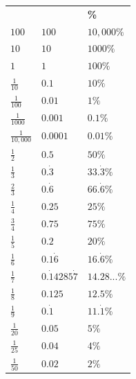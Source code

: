 \documentclass[9pt]{article}
\newcommand{\ealtext}[1]{\foreignlanguage{urdu}{#1}}
\newlength{\ealglosswd}
\newlength{\ealglossraise}
\newcommand{\ealkey}[1]{\textcolor{ealkeycolour}{#1}}
\newcommand{\ealgloss}[2]{%
  \sbox{\ealboxen}{\ealkey{#1}}%
  \sbox{\ealboxtr}{\small\textcolor{ealtwocolour}{\ealtext{#2}}}%
  \setlength{\ealglosswd}{\wd\ealboxen}%
  \ifdim\wd\ealboxtr>\ealglosswd\setlength{\ealglosswd}{\wd\ealboxtr}\fi
  \leavevmode
  \makebox[\ealglosswd][c]{%
    \makebox[0pt][c]{\usebox{\ealboxen}}%
    \makebox[0pt][c]{\raisebox{\ealglossraise}{\usebox{\ealboxtr}}}%
  }%
}
\begin{document}
\vspace{1pt}
\noindent
\begin{minipage}[t]{0.18\linewidth}
\vspace{0pt}
\noindent\colorbox{TitleBg}{}
\par\vspace{2pt}
\renewcommand{\arraystretch}{2.0}
{\scriptsize\setlength{\tabcolsep}{2pt}
\begin{tabular}{
  >{\bfseries\centering\arraybackslash}p{1.1cm}
  >{\bfseries\centering\arraybackslash}p{1.1cm}
  >{\bfseries\centering\arraybackslash}p{1.1cm}
}
\rowcolor{RowAlt}
\ealgloss{Fraction}{کسر} & \ealgloss{Decimal}{اعشاریہ} & \% \\
$100$  & $100$       & $10,000\%$         \\
$10$  & $10$       & $1000\%$         \\
$1$  & $1$       & $100\%$         \\
$\tfrac{1}{10}$  & $0.1$      & $10\%$         \\
$\tfrac{1}{100}$  & $0.01$      & $1\%$         \\
$\tfrac{1}{1000}$  & $0.001$       & $0.1\%$         \\
$\tfrac{1}{10,000}$  & $0.0001$       & $0.01\%$         \\
$\tfrac{1}{2}$  & $0.5$       & $50\%$         \\
$\tfrac{1}{3}$  & $0.\dot{3}$       & $33.\dot{3}\%$         \\
$\tfrac{2}{3}$  & $0.\dot{6}$       & $66.\dot{6}\%$         \\
$\tfrac{1}{4}$  & $0.25$       & $25\%$         \\
$\tfrac{3}{4}$  & $0.75$     & $75\%$       \\
$\tfrac{1}{5}$  & $0.2$     & $20\%$       \\
$\tfrac{1}{6}$  & $0.1\dot{6}$     & $16.\dot{6}\%$       \\
$\tfrac{1}{7}$  & $0.\dot{1}4285\dot{7}$     & $14.28...\%$       \\
$\tfrac{1}{8}$  & $0.125$ & $12.5\%$ \\
$\tfrac{1}{9}$  & $0.\dot{1}$ & $11.\dot{1}\%$ \\
$\tfrac{1}{20}$  & $0.05$ & $5\%$ \\
$\tfrac{1}{25}$  & $0.04$ & $4\%$ \\
$\tfrac{1}{50}$  & $0.02$ & $2\%$ \\
\end{tabular}
}
\end{minipage}\hfill
\end{document}
